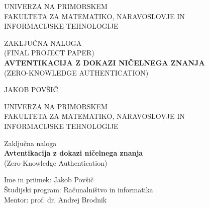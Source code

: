 \pagestyle{empty}
\reversemarginpar
{}

\begin{center}
\vspace{-1cm}
\noindent \large UNIVERZA NA PRIMORSKEM\\
\large FAKULTETA ZA MATEMATIKO, NARAVOSLOVJE IN\\
INFORMACIJSKE TEHNOLOGIJE


\vspace*{\fill}
\large ZAKLJUČNA NALOGA\\
\large (FINAL PROJECT PAPER)\\
\vspace{0.3cm}
\textbf{\Large AVTENTIKACIJA Z DOKAZI NIČELNEGA ZNANJA}\\
\Large (ZERO-KNOWLEDGE AUTHENTICATION)
\vspace*{\fill}
\vspace{1.8cm}
\end{center}


\begin{flushright}
\noindent \large JAKOB POVŠIČ\\
\vspace{2cm}
\end{flushright}

\newpage

\pagestyle{empty}
\begin{center}
\noindent \large UNIVERZA NA PRIMORSKEM\\
\large FAKULTETA ZA MATEMATIKO, NARAVOSLOVJE IN\\
INFORMACIJSKE TEHNOLOGIJE


\normalsize
\vspace{6cm}
Zaključna naloga\\
\textbf{\large Avtentikacija z dokazi ničelnega znanja}\\
\normalsize
(Zero-Knowledge Authentication)\\
\end{center}

\begin{flushleft}
\vspace{5cm}
\noindent Ime in priimek: Jakob Povšič
\\
\noindent Študijski program: Računalništvo in informatika
\\
\noindent Mentor: prof. dr. Andrej Brodnik
\\
\end{flushleft}

